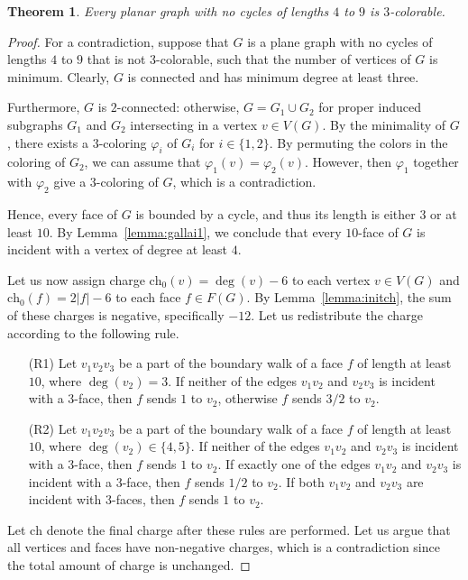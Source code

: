 \documentclass[12pt,twoside,openright,a4paper]{book}
\newtheorem{theorem}{Theorem}[chapter]
\newcommand{\initch}{\text{ch}_0}
\newcommand{\finch}{\text{ch}}
\begin{document}
\begin{theorem}\label{thm:no4to9}
Every planar graph with no cycles of lengths $4$ to $9$ is $3$-colorable.
\end{theorem}
\begin{proof}
For a contradiction, suppose that $G$ is a plane graph with no cycles of lengths $4$ to $9$ that is not $3$-colorable,
such that the number of vertices of $G$ is minimum.  Clearly, $G$ is connected and has minimum degree at least three.

Furthermore, $G$ is $2$-connected: otherwise, $G=G_1\cup G_2$ for proper induced subgraphs $G_1$ and $G_2$ intersecting
in a vertex $v\in V(G)$.  By the minimality of $G$, there exists a $3$-coloring $\varphi_i$ of $G_i$ for $i\in\{1,2\}$.
By permuting the colors in the coloring of $G_2$, we can assume that $\varphi_1(v)=\varphi_2(v)$.  However, then $\varphi_1$ together
with $\varphi_2$ give a $3$-coloring of $G$, which is a contradiction.

Hence, every face of $G$ is bounded by a cycle, and thus its length is either $3$ or at least $10$.
By Lemma~\ref{lemma:gallai1}, we conclude that every $10$-face of $G$ is
incident with a vertex of degree at least $4$.

Let us now assign charge $\initch(v)=\deg(v)-6$ to each vertex $v\in V(G)$ and $\initch(f)=2|f|-6$ to each face $f\in F(G)$.
By Lemma~\ref{lemma:initch}, the sum of these charges is negative, specifically $-12$.
Let us redistribute the charge according to the following rule.
\begin{itemize}
\item[(R1)] Let $v_1v_2v_3$ be a part of the boundary walk of a face $f$ of length at least $10$,
where $\deg(v_2)=3$.  If neither of the edges $v_1v_2$ and $v_2v_3$ is incident with a $3$-face,
then $f$ sends $1$ to $v_2$, otherwise $f$ sends $3/2$ to $v_2$.
\item[(R2)] Let $v_1v_2v_3$ be a part of the boundary walk of a face $f$ of length at least $10$,
where $\deg(v_2)\in\{4,5\}$.  If neither of the edges $v_1v_2$ and $v_2v_3$ is incident with a $3$-face,
then $f$ sends $1$ to $v_2$.  If exactly one of the edges $v_1v_2$ and $v_2v_3$ is incident with a $3$-face,
then $f$ sends $1/2$ to $v_2$.  If both $v_1v_2$ and $v_2v_3$ are incident with $3$-faces, then
$f$ sends $1$ to $v_2$.
\end{itemize}
Let $\finch$ denote the final charge after these rules are performed.
Let us argue that all vertices and faces have non-negative charges, which is a contradiction since the total amount of
charge is unchanged.


\end{proof}
\end{document}

